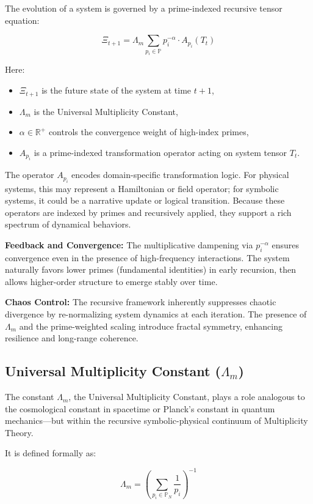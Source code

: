 \documentclass{article}
\theoremstyle{plain}
\begin{document}
The evolution of a system is governed by a prime-indexed recursive tensor equation:

\[
\Xi_{t+1} = \Lambda_m \sum_{p_i \in \mathbb{P}} p_i^{-\alpha} \cdot A_{p_i}(T_t)
\]

Here:
\begin{itemize}
    \item \( \Xi_{t+1} \) is the future state of the system at time \( t+1 \),
    \item \( \Lambda_m \) is the Universal Multiplicity Constant,
    \item \( \alpha \in \mathbb{R}^+ \) controls the convergence weight of high-index primes,
    \item \( A_{p_i} \) is a prime-indexed transformation operator acting on system tensor \( T_t \).
\end{itemize}

The operator \( A_{p_i} \) encodes domain-specific transformation logic. For physical systems, this may represent a Hamiltonian or field operator; for symbolic systems, it could be a narrative update or logical transition. Because these operators are indexed by primes and recursively applied, they support a rich spectrum of dynamical behaviors.

\textbf{Feedback and Convergence:} The multiplicative dampening via \( p_i^{-\alpha} \) ensures convergence even in the presence of high-frequency interactions. The system naturally favors lower primes (fundamental identities) in early recursion, then allows higher-order structure to emerge stably over time.

\textbf{Chaos Control:} The recursive framework inherently suppresses chaotic divergence by re-normalizing system dynamics at each iteration. The presence of \( \Lambda_m \) and the prime-weighted scaling introduce fractal symmetry, enhancing resilience and long-range coherence.

\subsection{Universal Multiplicity Constant (\( \Lambda_m \))}

The constant \( \Lambda_m \), the Universal Multiplicity Constant, plays a role analogous to the cosmological constant in spacetime or Planck’s constant in quantum mechanics—but within the recursive symbolic-physical continuum of Multiplicity Theory.

It is defined formally as:

\[
\Lambda_m = \left( \sum_{p_i \in \mathbb{P}_N} \frac{1}{p_i} \right)^{-1}
\]
\end{document}
